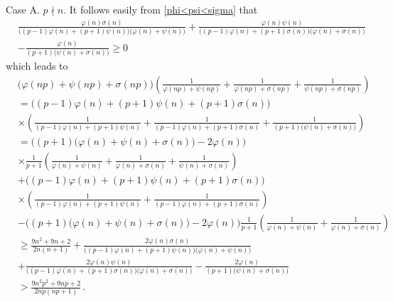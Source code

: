 \documentclass[12pt]{article}
\begin{document}
Case A.  \;  $p\nmid n$. It follows easily from \eqref{phi<psi<sigma} that
\begin{align*}
&\frac{\varphi(n)\sigma(n)}{\big((p-1)\varphi(n)+(p+1)\psi(n)\big)\big(\varphi(n)+\psi(n)\big)}+\frac{\varphi(n)\psi(n)}{\big((p-1)\varphi(n)+(p+1)\sigma(n)\big)\big(\varphi(n)+\sigma(n)\big)}\\
&-\frac{\varphi(n)}{(p+1)\big(\psi(n)+\sigma(n)\big)}\geq0
\end{align*}
which leads to
\begin{align*}
&\big(\varphi(np)+\psi(np)+\sigma(np)\big)\left(\frac{1}{\varphi(np)+\psi(np)}+\frac{1}{\varphi(np)+\sigma(np)}+\frac{1}{\psi(np)+\sigma(np)}\right)\\
&=\Big((p-1)\varphi(n)+(p+1)\psi(n)+(p+1)\sigma(n)\Big)\\
&\times\left(\frac{1}{(p-1)\varphi(n)+(p+1)\psi(n)}+\frac{1}{(p-1)\varphi(n)+(p+1)\sigma(n)}+\frac{1}{(p+1)\big(\psi(n)+\sigma(n)\big)}\right)\\
&=\Big((p+1)\big(\varphi(n)+\psi(n)+\sigma(n)\big)-2\varphi(n)\Big)\\
&\times\frac{1}{p+1}\left(\frac{1}{\varphi(n)+\psi(n)}+\frac{1}{\varphi(n)+\sigma(n)}+\frac{1}{\psi(n)+\sigma(n)}\right)\\
&+\Big((p-1)\varphi(n)+(p+1)\psi(n)+(p+1)\sigma(n)\Big)\\
&\times\left(\frac{1}{(p-1)\varphi(n)+(p+1)\psi(n)}+\frac{1}{(p-1)\varphi(n)+(p+1)\sigma(n)}\right)\\
&-\Big((p+1)\big(\varphi(n)+\psi(n)+\sigma(n)\big)-2\varphi(n)\Big)\frac{1}{p+1}\left(\frac{1}{\varphi(n)+\psi(n)}+\frac{1}{\varphi(n)+\sigma(n)}\right)\\
&\geq\frac{9n^2+9n+2}{2n(n+1)}+\frac{2\varphi(n)\sigma(n)}{\big((p-1)\varphi(n)+(p+1)\psi(n)\big)\big(\varphi(n)+\psi(n)\big)}\\
&+\frac{2\varphi(n)\psi(n)}{\big((p-1)\varphi(n)+(p+1)\sigma(n)\big)\big(\varphi(n)+\sigma(n)\big)}-\frac{2\varphi(n)}{(p+1)\big(\psi(n)+\sigma(n)\big)}\\
&>\frac{9n^2p^2+9np+2}{2np(np+1)}\,.
\end{align*}
\end{document}
